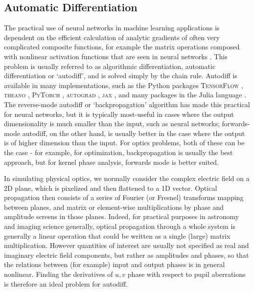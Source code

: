 \documentclass[modern]{aastex63}
\begin{document}
\subsection{Automatic Differentiation}
The practical use of neural networks in machine learning applications is dependent on the efficient calculation of analytic gradients of often very complicated composite functions, for example the matrix operations composed with nonlinear activation functions that are seen in neural networks \citep{lecun15}. This problem is usually referred to as algorithmic differentiation, automatic differentiation or `autodiff', and is solved simply by the chain rule.
Autodiff is available in many implementations, such as the Python packages \textsc{TensorFlow} \citep{tensorflow2015}, \textsc{theano} \citep{theano}, \textsc{PyTorch} \citep{pytorch}, \textsc{autograd} \citep{autograd}, \textsc{jax} \citep{jax}, and many packages in the Julia language \citep{julia}. The reverse-mode autodiff or `backpropagation' algorithm \citep{linnainmaa1970,lecun1988theoretical} has made this practical for neural networks, but it is typically most-useful in cases where the output dimensionality is much smaller than the input, such as neural networks; forwards-mode autodiff, on the other hand, is usually better in the case where the output is of higher dimension than the input. For optics problems, both of these can be the case - for example, for optimization, backpropagation is usually the best approach, but for kernel phase analysis, forwards mode is better suited.

In simulating physical optics, we normally consider the complex electric field on a 2D plane, which is pixelized and then flattened to a 1D vector.
Optical propagation then consists of a series of Fourier (or  Fresnel) transforms mapping between planes, and matrix or element-wise multiplications by phase and amplitude screens in those planes. Indeed, for practical purposes in astronomy and imaging science generally, optical propagation through a whole system is generally a linear operation that could be written as a single (large) matrix multiplication. However quantities of interest are usually not specified as real and imaginary electric field components, but rather as amplitudes and phases, so that the relations between (for example) input and output phases is in general nonlinear. Finding the derivatives of $u,v$ phase with respect to pupil aberrations is therefore an ideal problem for autodiff.
\end{document}
